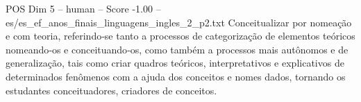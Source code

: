 \begin{textsample}{POS Dim 5 – human – Score -1.00 – es/es\_ef\_anos\_finais\_linguagens\_ingles\_2\_p2.txt}  \label{ex:f5_pos_012}
Conceitualizar por nomeação e com teoria, referindo‐se tanto a processos de categorização de elementos teóricos nomeando‐os e conceituando‐os, como também a processos mais autônomos e de generalização, tais como criar quadros teóricos, interpretativos e explicativos de determinados fenômenos com a ajuda dos conceitos e nomes dados, tornando os estudantes conceituadores, criadores de conceitos.

\end{textsample}
